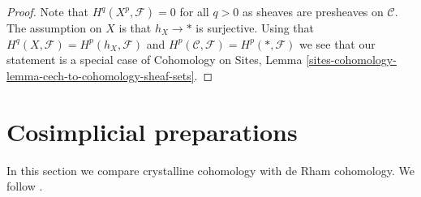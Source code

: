 \begin{proof}
Note that $H^q(X^p, \mathcal{F}) = 0$ for all $q > 0$ as sheaves are
presheaves on $\mathcal{C}$. The assumption on $X$ is that $h_X \to *$
is surjective. Using that $H^q(X, \mathcal{F}) = H^p(h_X, \mathcal{F})$ and
$H^p(\mathcal{C}, \mathcal{F}) = H^p(*, \mathcal{F})$ we see that our
statement is a special case of
Cohomology on Sites,
Lemma \ref{sites-cohomology-lemma-cech-to-cohomology-sheaf-sets}.
\end{proof}









\section{Cosimplicial preparations}
\label{section-cohomology}

\noindent
In this section we compare crystalline cohomology with de Rham
cohomology. We follow \cite{Bhatt}.

